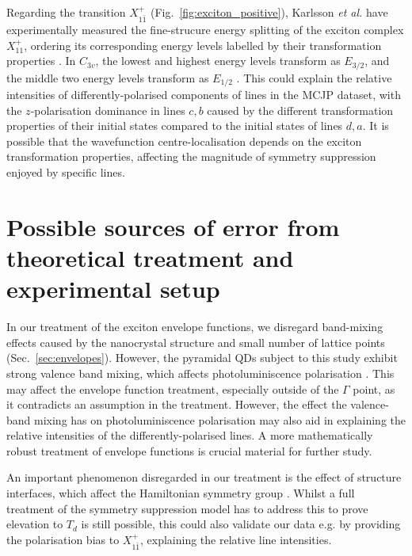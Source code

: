 Regarding the transition $X^+_{1\bar{1}}$ (Fig.~\ref{fig:exciton_positive}), Karlsson \textit{et al.} have experimentally measured the fine-strucure energy splitting of the exciton complex $X^+_{11}$, ordering its corresponding energy levels labelled by their transformation properties \cite[p.~16]{karlsson}. In $C_{3v}$, the lowest and highest energy levels transform as $E_{3/2}$, and the middle two energy levels transform as $E_{1/2}$ \cite[Fig.~17]{karlsson}. This could explain the relative intensities of differently-polarised components of lines in the MCJP dataset, with the $z$-polarisation dominance in lines $c,b$ caused by the different transformation properties of their initial states compared to the initial states of lines $d,a$. It is possible that the wavefunction centre-localisation depends on the exciton transformation properties, affecting the magnitude of symmetry suppression enjoyed by specific lines.

\section{Possible sources of error from theoretical treatment and experimental setup}

In our treatment of the exciton envelope functions, we disregard band-mixing effects caused by the nanocrystal structure and small number of lattice points (Sec.~\ref{sec:envelopes}). However, the pyramidal QDs subject to this study exhibit strong valence band mixing, which affects photoluminiscence polarisation \cite{strong_band_mixing}. This may affect the envelope function treatment, especially outside of the $\Gamma$ point, as it contradicts an assumption in the treatment. However, the effect the valence-band mixing has on photoluminiscence polarisation may also aid in explaining the relative intensities of the differently-polarised lines. A more mathematically robust treatment of envelope functions is crucial material for further study.

An important phenomenon disregarded in our treatment is the effect of structure interfaces, which affect the Hamiltonian symmetry group \cite{interfaces}. Whilst a full treatment of the symmetry suppression model has to address this to prove elevation to $T_d$ is still possible, this could also validate our data e.g. by providing the polarisation bias to $X^+_{1\bar{1}}$, explaining the relative line intensities.

